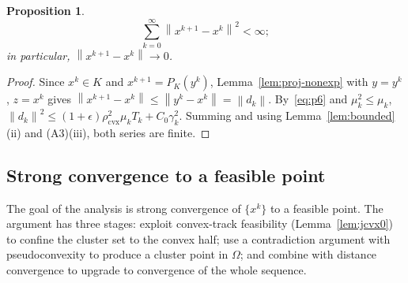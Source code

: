 \documentclass[]{interact}
\theoremstyle{plain}
\newtheorem{proposition}[theorem]{Proposition}
\theoremstyle{definition}
\theoremstyle{remark}
\newcommand{\norm}[1]{\left\lVert #1 \right\rVert}
\newcommand{\cvx}{\mathrm{cvx}}
\begin{document}
\begin{proposition}\label{prop:regularity}
\[
\sum_{k=0}^{\infty}\norm{x^{k+1}-x^k}^{2}<\infty;
\]
in particular,
$\norm{x^{k+1}-x^k}\to0$.
\end{proposition}
\begin{proof}
Since $x^k\in K$ and $x^{k+1}=P_K(y^k)$, Lemma~\ref{lem:proj-nonexp} with $y=y^k$, $z=x^k$
gives $\norm{x^{k+1}-x^k}\le\norm{y^k-x^k}=\norm{d_k}$. By~\eqref{eq:p6} and
$\mu_k^2\le\mu_k$, $\norm{d_k}^2\le(1+\epsilon)\rho_{\cvx}^2\mu_k T_k+C_0\gamma_k^2$.
Summing and using Lemma~\ref{lem:bounded}(ii) and (A3)(iii), both series are finite.
\end{proof}

\subsection{Strong convergence to a feasible point}\label{ssec:strong}
The goal of the analysis is strong convergence of $\{x^k\}$ to a feasible point. The
argument has three stages: exploit convex-track feasibility (Lemma~\ref{lem:jcvx0}) to
confine the cluster set to the convex half; use a contradiction argument with
pseudoconvexity to produce a cluster point in $\Omega$; and combine with distance
convergence to upgrade to convergence of the whole sequence.
\end{document}
